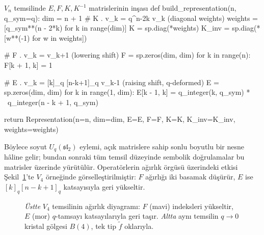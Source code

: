 \documentclass[10pt]{math}
\numberwithin{equation}{section}
\theoremstyle{plain}
\theoremstyle{definition}
\renewcommand{\sl}{\mathfrak{sl}}
\newcommand{\Uq}{U_q(\sl_2)}
\newcommand{\qint}[1]{[#1]_q}
\begin{document}
\begin{pythoncode}{$V_n$ temsilinde $E,F,K,K^{-1}$ matrislerinin inşası}
def build_representation(n, q_sym=q):
    dim = n + 1
    # K . v_k = q^{n-2k} v_k  (diagonal weights)
    weights = [q_sym**(n - 2*k) for k in range(dim)]
    K = sp.diag(*weights)
    K_inv = sp.diag(*[w**(-1) for w in weights])

    # F . v_k = v_{k+1}  (lowering shift)
    F = sp.zeros(dim, dim)
    for k in range(n):
        F[k + 1, k] = 1

    # E . v_k = [k]_q [n-k+1]_q v_{k-1}  (raising shift, q-deformed)
    E = sp.zeros(dim, dim)
    for k in range(1, dim):
        E[k - 1, k] = q_integer(k, q_sym) * \
                      q_integer(n - k + 1, q_sym)

    return Representation(n=n, dim=dim, E=E, F=F, K=K,
                          K_inv=K_inv, weights=weights)
\end{pythoncode}

Böylece soyut $\Uq$ eylemi, açık matrislere sahip sonlu boyutlu bir nesne
hâline gelir; bundan sonraki tüm temsil düzeyinde sembolik doğrulamalar bu
matrisler üzerinde yürütülür. Operatörlerin ağırlık örgüsü üzerindeki etkisi
Şekil~\ref{fig:weight}'te $V_4$ örneğinde görselleştirilmiştir: $F$ ağırlığı iki
basamak düşürür, $E$ ise $\qint{k}\qint{n-k+1}$ katsayısıyla geri yükseltir.

\begin{figure}[h]
\centering
{}
\caption{\emph{Üstte} $V_4$ temsilinin ağırlık diyagramı: $F$ (mavi) indeksleri
yükseltir, $E$ (mor) $q$-tamsayı katsayılarıyla geri taşır. \emph{Altta} aynı
temsilin $q\to 0$ kristal gölgesi $B(4)$, tek tip $\tilde f$ oklarıyla.}
\label{fig:weight}
\end{figure}
\end{document}
